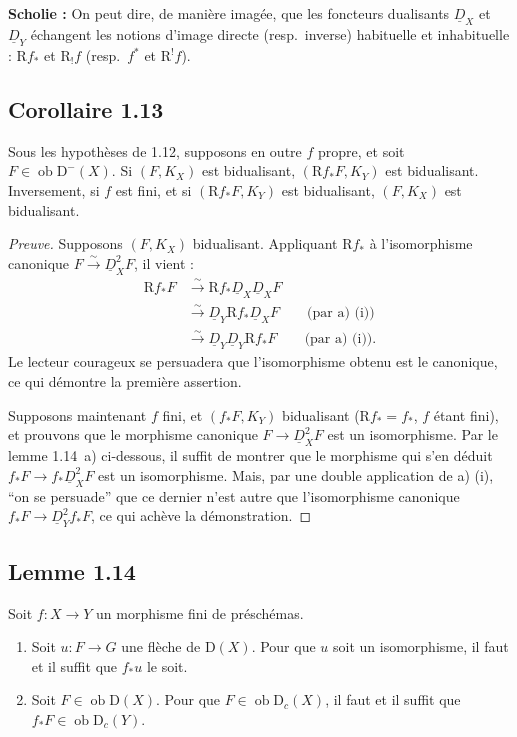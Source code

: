 \documentclass[11pt]{article}
\newcommand{\R}{\mathrm{R}}
\newcommand{\D}{\mathrm{D}}
\newcommand{\ob}{\operatorname{ob}}
\providecommand{\ob}{\operatorname{ob}}
\begin{document}
\textbf{Scholie :} On peut dire, de manière imagée, que les foncteurs dualisants $\underline{D}_X$ et $\underline{D}_Y$ échangent les notions d'image directe (resp.~inverse) habituelle et inhabituelle : $\R f_{*}$ et $\R_{!}f$ (resp.~$f^{*}$ et $\R^{!}f$).

\subsection*{Corollaire 1.13}
Sous les hypothèses de 1.12, supposons en outre $f$ propre, et soit $F \in \ob \D^{-}(X)$. Si $(F, K_X)$ est bidualisant, $(\R f_{*}F, K_Y)$ est bidualisant. Inversement, si $f$ est fini, et si $(\R f_{*}F, K_Y)$ est bidualisant, $(F, K_X)$ est bidualisant.

\begin{proof}[Preuve]
Supposons $(F, K_X)$ bidualisant. Appliquant $\R f_{*}$ à l'isomorphisme canonique $F \xrightarrow{\sim} \underline{D}_X^{2} F$, il vient :
\begin{align*}
\R f_{*} F &\xrightarrow{\sim} \R f_{*} \underline{D}_X \underline{D}_X F \\
&\xrightarrow{\sim} \underline{D}_Y \R f_{*} \underline{D}_X F \qquad \text{(par a) (i))} \\
&\xrightarrow{\sim} \underline{D}_Y \underline{D}_Y \R f_{*} F \qquad \text{(par a) (i)).}
\end{align*}
Le lecteur courageux se persuadera que l'isomorphisme obtenu est le canonique, ce qui démontre la première assertion.

Supposons maintenant $f$ fini, et $(f_{*}F, K_Y)$ bidualisant ($\R f_{*} = f_{*}$, $f$ étant fini), et prouvons que le morphisme canonique $F \to \underline{D}_X^{2} F$ est un isomorphisme. Par le lemme 1.14~a) ci-dessous, il suffit de montrer que le morphisme qui s'en déduit $f_{*}F \to f_{*}\underline{D}_X^{2} F$ est un isomorphisme. Mais, par une double application de a) (i), ``on se persuade'' que ce dernier n'est autre que l'isomorphisme canonique $f_{*}F \to \underline{D}_Y^{2} f_{*}F$, ce qui achève la démonstration.
\end{proof}

\subsection*{Lemme 1.14}
Soit $f : X \to Y$ un morphisme fini de préschémas.
\begin{enumerate}
\item[a)] Soit $u : F \to G$ une flèche de $\D(X)$. Pour que $u$ soit un isomorphisme, il faut et il suffit que $f_{*}u$ le soit.
\item[b)] Soit $F \in \ob \D(X)$. Pour que $F \in \ob \D_c(X)$, il faut et il suffit que $f_{*}F \in \ob \D_c(Y)$.
\end{enumerate}
\end{document}
